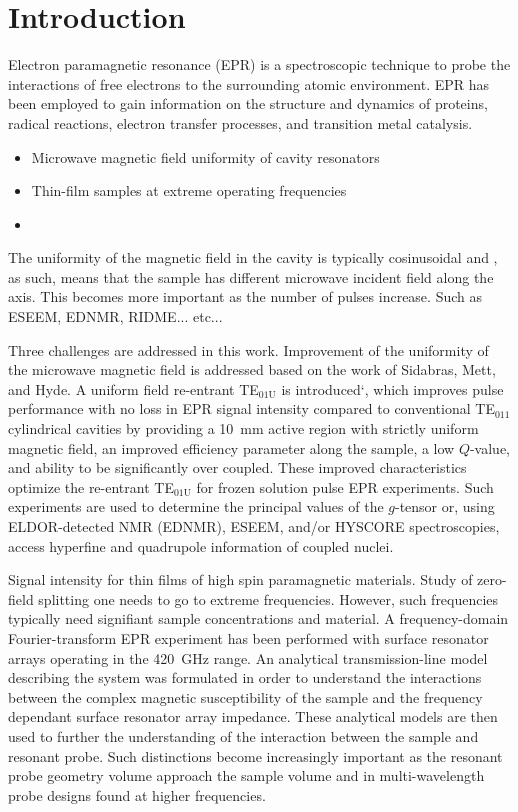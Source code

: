 \chapter[Introduction]{Introduction}

Electron paramagnetic resonance (EPR) is a spectroscopic technique to probe the interactions of free electrons to the surrounding atomic environment. EPR has been employed to gain information on the structure and dynamics of proteins, radical reactions, electron transfer processes, and transition metal catalysis. 

\begin{itemize}
    \item Microwave magnetic field uniformity of cavity resonators 
    \item Thin-film samples at extreme operating frequencies
    \item 
\end{itemize}

The uniformity of the magnetic field in the cavity is typically cosinusoidal and , as such, means that the sample has different microwave incident field along the axis. This becomes more important as the number of pulses increase. Such as ESEEM, EDNMR, RIDME... etc... 



Three challenges are addressed in this work. Improvement of the uniformity of the microwave magnetic field is addressed based on the work of Sidabras, Mett, and Hyde. A uniform field re-entrant TE$_{\text{01U}}$ is introduced`, which improves pulse performance with no loss in EPR signal intensity compared to conventional TE$_{011}$ cylindrical cavities by providing a 10~mm active region with strictly uniform magnetic field, an improved efficiency parameter along the sample, a low $Q$-value, and ability to be significantly over coupled. These improved characteristics optimize the re-entrant TE$_{\text{01U}}$ for frozen solution pulse EPR experiments. Such experiments are used to determine the principal values of the $g$-tensor or, using ELDOR-detected NMR (EDNMR), ESEEM, and/or HYSCORE spectroscopies, access hyperfine and quadrupole information of coupled nuclei. 

Signal intensity for thin films of high spin paramagnetic materials. Study of zero-field splitting one needs to go to extreme frequencies. However, such frequencies typically need signifiant sample concentrations and material. A frequency-domain Fourier-transform EPR experiment has been performed with surface resonator arrays operating in the 420~GHz range. An analytical transmission-line model describing the system was formulated in order to understand the interactions between the complex magnetic susceptibility of the sample and the frequency dependant surface resonator array impedance. These analytical models are then used to further the understanding of the interaction between the sample and resonant probe. Such distinctions become increasingly important as the resonant probe geometry volume approach the sample volume and in multi-wavelength probe designs found at higher frequencies. 

